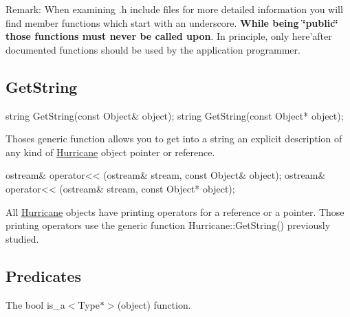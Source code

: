 \begin{DoxyParagraph}{Remark\-:}
When examining {\ttfamily }.h include files for more detailed information you will find member functions which start with an underscore. {\bfseries While being \char`\"{}public\char`\"{} those functions must never be called upon}. In principle, only here'after documented functions should be used by the application programmer.
\end{DoxyParagraph}
\hypertarget{group__Generalities_secGeneralitiesGetString}{}\subsection{Get\-String}\label{group__Generalities_secGeneralitiesGetString}

\begin{DoxyCode}
\textcolor{keywordtype}{string} GetString(\textcolor{keyword}{const} Object& \textcolor{keywordtype}{object});
\textcolor{keywordtype}{string} GetString(\textcolor{keyword}{const} Object* \textcolor{keywordtype}{object});
\end{DoxyCode}
 Thoses generic function allows you to get into a string an explicit description of any kind of \hyperlink{namespaceHurricane}{Hurricane} object pointer or reference. 
\begin{DoxyCode}
ostream& operator<< (ostream& stream, \textcolor{keyword}{const} Object& \textcolor{keywordtype}{object});
ostream& operator<< (ostream& stream, \textcolor{keyword}{const} Object* \textcolor{keywordtype}{object});
\end{DoxyCode}
 All \hyperlink{namespaceHurricane}{Hurricane} objects have printing operators for a reference or a pointer. Those printing operators use the generic function Hurricane\-::\-Get\-String() previously studied.\hypertarget{group__Generalities_secGeneralitiesPredicates}{}\subsection{Predicates}\label{group__Generalities_secGeneralitiesPredicates}
The {\ttfamily bool} {\ttfamily is\-\_\-a$<$\-Type$\ast$$>$(object)} function.

